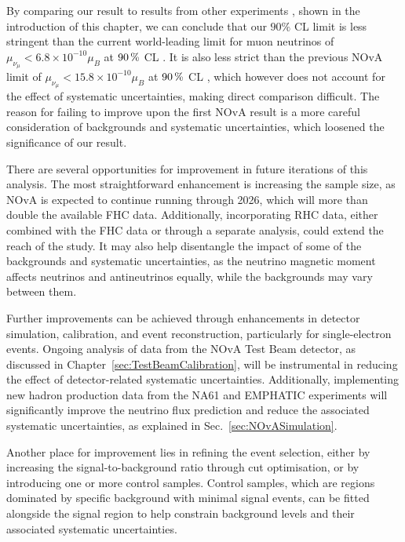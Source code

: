 By comparing our result to results from other experiments \cite{PDG.pdf}, shown in the introduction of this chapter, we can conclude that our $90\%$ \gls{CL} limit is less stringent than the current world-leading limit for muon neutrinos of $\mu_{\nu_\mu}<6.8\times 10^{-10}\mu_B$  at $\unit[90]{\%}$ \gls{CL} \cite{LSNDLimits2001.pdf}. It is also less strict than the previous \gls{NOvA} limit of $\mu_{\nu_\mu}<15.8\times 10^{-10}\mu_B$ at $\unit[90]{\%}$ \gls{CL} \cite{nuMM-thesis-biaow.pdf}, which however does not account for the effect of systematic uncertainties, making direct comparison difficult. The reason for failing to improve upon the first \gls{NOvA} result is a more careful consideration of backgrounds and systematic uncertainties, which loosened the significance of our result.

There are several opportunities for improvement in future iterations of this analysis. The most straightforward enhancement is increasing the sample size, as \gls{NOvA} is expected to continue running through 2026, which will more than double the available \gls{FHC} data. Additionally, incorporating \gls{RHC} data, either combined with the \gls{FHC} data or through a separate analysis, could extend the reach of the study. It may also help disentangle the impact of some of the backgrounds and systematic uncertainties, as the neutrino magnetic moment affects neutrinos and antineutrinos equally, while the backgrounds may vary between them.

Further improvements can be achieved through enhancements in detector simulation, calibration, and event reconstruction, particularly for single-electron events. Ongoing analysis of data from the \gls{NOvA} Test Beam detector, as discussed in Chapter~\ref{sec:TestBeamCalibration}, will be instrumental in reducing the effect of detector-related systematic uncertainties. Additionally, implementing new hadron production data from the NA61 and EMPHATIC experiments will significantly improve the neutrino flux prediction and reduce the associated systematic uncertainties, as explained in Sec.~\ref{sec:NOvASimulation}.

Another place for improvement lies in refining the event selection, either by increasing the signal-to-background ratio through cut optimisation, or by introducing one or more control samples. Control samples, which are regions dominated by specific background with minimal signal events, can be fitted alongside the signal region to help constrain background levels and their associated systematic uncertainties.

